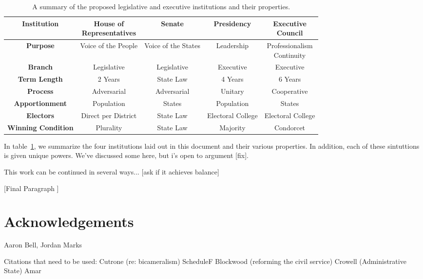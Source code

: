 \documentclass{article}
\begin{document}
\begin{table}[ht]
\label{table:institutions}
\centering
\renewcommand{\arraystretch}{1.5}
\begin{tabular}{|c|c|c|c|c|}
\hline
\textbf{Institution} & \makecell{House of \\ Representatives} & Senate & Presidency & \makecell{Executive \\ Council}  \\
\hline
\textbf{Purpose} & Voice of the People & Voice of the States & Leadership & \makecell{Professionalism \\ Continuity} \\
\hline
\textbf{Branch} & Legislative & Legislative & Executive & Executive \\
\hline
\textbf{Term Length} & 2 Years & State Law & 4 Years & 6 Years \\
\hline
\textbf{Process} & Adversarial & Adversarial & Unitary & Cooperative \\
\hline
\textbf{Apportionment} & Population & States & Population & States  \\
\hline
\textbf{Electors} & Direct per District & State Law  & Electoral College & Electoral College  \\
\hline
\textbf{Winning Condition} & Plurality & State Law & Majority & Condorcet  \\
\hline
\end{tabular}
\caption{A summary of the proposed legislative and executive institutions and their properties. }
\end{table}

In table~\ref{table:institutions}, we summarize the four institutions laid out in this document and their various properties. In addition, each of these sintuttions is given unique powers. We've discussed some here, but i's open to argument [fix].

This work can be continued in several ways... [ask if it achieves balance]

[Final Paragraph ]

\section{Acknowledgements}

Aaron Bell, Jordan Marks

Citations that need to be used:
Cutrone (re: bicameralism)
ScheduleF
Blockwood (reforming the civil service)
Crowell (Administrative State)
Amar
\end{document}
